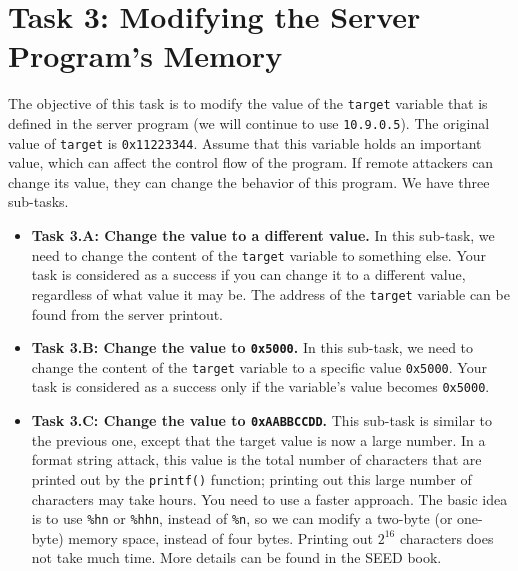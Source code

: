 \section{Task 3: Modifying the Server Program's Memory}

The objective of this task is to modify the value of the 
\texttt{target} variable that is defined in the 
server program (we will continue to use \texttt{10.9.0.5}). 
The original value of \texttt{target} is \texttt{0x11223344}. 
Assume that this variable holds an important value, which can affect the 
control flow of the program. If remote attackers can change its value, 
they can change the behavior of this program. We have three sub-tasks. 

\begin{itemize} 
\item \textbf{Task 3.A: Change the value to a different value.}
In this sub-task, we need to change the content of the \texttt{target} variable
to something else. Your task is considered as a success if you can change it to a
different value, regardless of what value it may be. The address of 
the \texttt{target} variable can be found from the server printout. 


\item \textbf{Task 3.B: Change the value to \texttt{0x5000}.}  
In this sub-task, we need to change the content of the \texttt{target} variable
to a specific value \texttt{0x5000}. Your task is considered as 
a success only if the variable's value becomes \texttt{0x5000}. 


\item \textbf{Task 3.C: Change the value to \texttt{0xAABBCCDD}.}  
This sub-task is similar to the previous one, except that the target value is 
now a large number. In a format string attack, this 
value is the total number of characters that
are printed out by the \texttt{printf()} function; printing out 
this large number of characters may take hours. You need to use a faster approach. The 
basic idea is to use \texttt{\%hn} or \texttt{\%hhn}, instead of \texttt{\%n}, so we can modify 
a two-byte (or one-byte) memory space, instead of four bytes. Printing out
$2^{16}$ characters does not take much time. More details 
can be found in the SEED book.
\end{itemize} 



